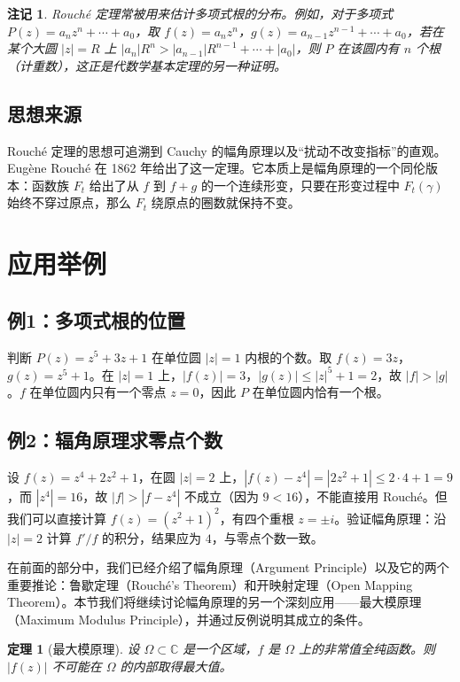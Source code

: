 \documentclass[UTF8]{ctexart}
\newtheorem{theorem}{定理}[section]
\newtheorem{remark}{注记}[section]
\numberwithin{equation}{section}
\newcommand{\CC}{\mathbb{C}}
\begin{document}
\begin{remark}
Rouché 定理常被用来估计多项式根的分布。例如，对于多项式 $P(z)=a_n z^n + \cdots + a_0$，取 $f(z)=a_n z^n$，$g(z)=a_{n-1}z^{n-1}+\cdots+a_0$，若在某个大圆 $|z|=R$ 上 $|a_n|R^n > |a_{n-1}|R^{n-1}+\cdots+|a_0|$，则 $P$ 在该圆内有 $n$ 个根（计重数），这正是代数学基本定理的另一种证明。
\end{remark}

\subsection{思想来源}

Rouché 定理的思想可追溯到 Cauchy 的幅角原理以及“扰动不改变指标”的直观。Eugène Rouché 在 1862 年给出了这一定理。它本质上是幅角原理的一个同伦版本：函数族 $F_t$ 给出了从 $f$ 到 $f+g$ 的一个连续形变，只要在形变过程中 $F_t(\gamma)$ 始终不穿过原点，那么 $F_t$ 绕原点的圈数就保持不变。

\section{应用举例}

\subsection{例1：多项式根的位置}
判断 $P(z)=z^5+3z+1$ 在单位圆 $|z|=1$ 内根的个数。取 $f(z)=3z$，$g(z)=z^5+1$。在 $|z|=1$ 上，$|f(z)|=3$，$|g(z)|\le |z|^5+1=2$，故 $|f|>|g|$。$f$ 在单位圆内只有一个零点 $z=0$，因此 $P$ 在单位圆内恰有一个根。

\subsection{例2：辐角原理求零点个数}
设 $f(z)=z^4+2z^2+1$，在圆 $|z|=2$ 上，$|f(z)-z^4| = |2z^2+1| \le 2\cdot 4+1=9$，而 $|z^4|=16$，故 $|f|>|f-z^4|$ 不成立（因为 $9<16$），不能直接用 Rouché。但我们可以直接计算 $f(z)=(z^2+1)^2$，有四个重根 $z=\pm i$。验证幅角原理：沿 $|z|=2$ 计算 $f'/f$ 的积分，结果应为 $4$，与零点个数一致。


在前面的部分中，我们已经介绍了幅角原理（Argument Principle）以及它的两个重要推论：鲁歇定理（Rouché's Theorem）和开映射定理（Open Mapping Theorem）。本节我们将继续讨论幅角原理的另一个深刻应用——最大模原理（Maximum Modulus Principle），并通过反例说明其成立的条件。

\begin{theorem}[最大模原理]
设 $\Omega \subset \CC$ 是一个区域，$f$ 是 $\Omega$ 上的非常值全纯函数。则 $|f(z)|$ 不可能在 $\Omega$ 的内部取得最大值。
\end{theorem}
\end{document}

